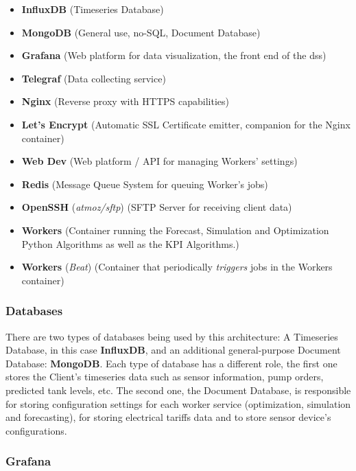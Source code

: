 \begin{itemize}

\item \textbf{InfluxDB} (Timeseries Database)
\item \textbf{MongoDB} (General use, no-SQL, Document Database)
\item \textbf{Grafana} (Web platform for data visualization, the front end of the \gls{dss})
\item \textbf{Telegraf} (Data collecting service)
\item \textbf{Nginx} (Reverse proxy with HTTPS capabilities)
\item \textbf{Let's Encrypt} (Automatic SSL Certificate emitter, companion for the Nginx container)
\item \textbf{Web Dev} (Web platform / API for managing Workers' settings)
\item \textbf{Redis} (Message Queue System for queuing Worker's jobs)
\item \textbf{OpenSSH} (\textit{atmoz/sftp}) (SFTP Server for receiving client data)
\item \textbf{Workers} (Container running the Forecast, Simulation and Optimization Python Algorithms as well as the KPI Algorithms.)
\item \textbf{Workers} (\textit{Beat}) (Container that periodically \textit{triggers} jobs in the Workers container)

\end{itemize}




\subsubsection{Databases}
\label{methodology:sss:databases}

There are two types of databases being used by this architecture: A Timeseries Database, in this case \textbf{InfluxDB}, and an additional general-purpose Document Database: \textbf{MongoDB}. Each type of database has a different role, the first one stores the Client's timeseries data such as sensor information, pump orders, predicted tank levels, etc.
The second one, the Document Database, is responsible for storing configuration settings for each worker service (optimization, simulation and forecasting), for storing electrical tariffs data and to store sensor device's configurations.

\subsubsection{Grafana}
\label{methodology:sss:grafana}

